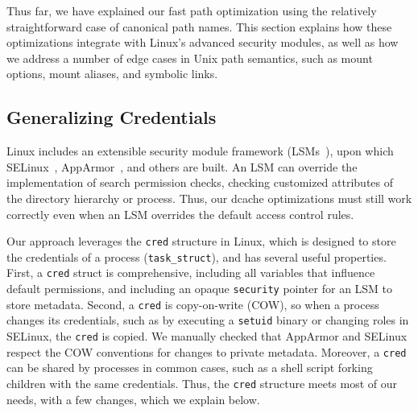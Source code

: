 Thus far, we have explained our fast path optimization using the relatively straightforward
case of canonical path names.  
This section explains how these optimizations integrate with Linux's
advanced security modules,
as well as how we 
address a number of edge cases in Unix path semantics,
such as mount options, mount aliases, and symbolic links.  

\subsection{Generalizing Credentials}
\label{sec:dcache:cred}
\label{sec:dcache:selinux}

Linux includes an extensible security
module framework (LSMs~\citep{wright+lsm}), upon which SELinux~\citep{selinux}, AppArmor~\citep{apparmor}, and others are built.
An LSM can override the implementation of search permission checks,
checking customized attributes of the directory hierarchy or
process.
Thus, our dcache optimizations must still work correctly even when an LSM overrides the default access control rules.

Our approach leverages the {\tt cred} structure in Linux, which is designed to store 
the credentials of a 
process ({\tt task\_struct}), and has several useful properties.
First, a {\tt cred} struct is comprehensive, including all variables that influence default permissions,
and including an opaque {\tt security} pointer for an LSM to store metadata.
Second, a {\tt cred} is copy-on-write (COW), so when a process changes its credentials, such as 
by executing a {\tt setuid} binary or changing roles in SELinux, 
the {\tt cred} is copied.  We manually checked 
that AppArmor and SELinux respect the COW conventions for changes to private metadata.
Moreover, a {\tt cred} can be shared by processes in common cases, such as a shell script forking children with the same credentials.
Thus, the {\tt cred} structure meets most of our needs, with a few changes, which we explain below.

